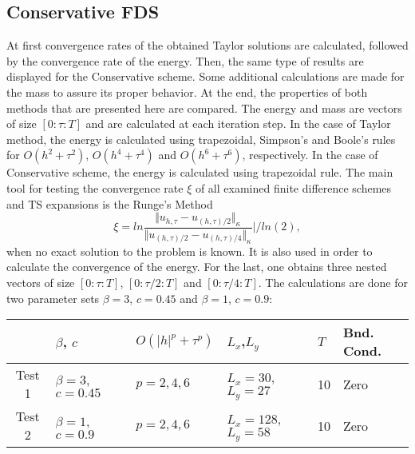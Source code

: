 \documentclass[%
 aip,
cp,  %
 amsmath,amssymb,%
 reprint,%
]{revtex4-2}
\begin{document}
\subsection{ Conservative FDS }

At first convergence rates of the obtained Taylor solutions are calculated, followed by the convergence rate of the energy. Then, the same type of results are displayed for the Conservative scheme. Some additional calculations are made for the mass to assure its proper behavior. At the end, the properties of both methods that are presented here are compared. The energy and mass are vectors of size $[0:\tau:T]$ and are calculated at each iteration step. In the case of Taylor method, the energy is calculated using trapezoidal, Simpson's and Boole's rules for $O(h^{2} + \tau^2 )$, $O(h^{4} + \tau^4 )$ and $O(h^{6} + \tau^6 )$, respectively. In the case of Conservative scheme, the energy is calculated using trapezoidal rule. The main tool for testing the convergence rate $\xi$ of all examined finite difference schemes and TS expansions is the Runge's Method
\begin{equation}\label{Runge}
\xi = ln  \frac{\Vert u_{h,\tau} - u_{(h,\tau)/2} \Vert_\kappa } {\Vert  u_{(h,\tau)/2} - u_{(h,\tau)/4} \Vert_\kappa  } | / ln(2),
\end{equation}
when no exact solution to the problem is known. It is also used in order to calculate the convergence of the energy. For the last, one obtains three nested vectors of size $[0:\tau:T]$, $[0:\tau/2:T]$ and $[0:\tau/4:T]$. The calculations are done for two parameter sets $\beta = 3$, $c=0.45$ and $\beta = 1$, $c=0.9$:

\begin{table}[ht]
\centering
\small
		\begin{tabular}{||c|l|l|l|l|l||}
			\hline
			\hline
                                            &    $\beta$, $c$                              & $O(|h|^p + \tau^p)$                                 & $L_x$,$L_y$                                & $T$      &  Bnd. Cond.   \\

   			\hline 
					\hline 
           Test 1                        &      $\beta = 3$, $c=0.45$           &      $p=2, 4, 6$                              & $L_x = 30$,$L_y=27$                &                10    &    Zero  \\
	   \hline
			\hline 
           Test 2                        &      $\beta = 1$, $c=0.9$             &      $p=2, 4, 6$                              & $L_x = 128$,$L_y=58$                &               10    &   Zero  \\
	   \hline
			\hline 
		\end{tabular}

\end{table}
\end{document}
